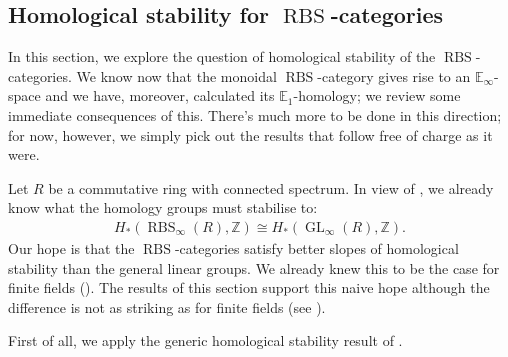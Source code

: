 \documentclass[12pt, reqno]{amsart}
\theoremstyle{plain}
\theoremstyle{definition}
\newcommand{\Z}{\mathbb Z}
\begin{document}
\subsection{Homological stability for \texorpdfstring{$\operatorname{RBS}$}{RBS}-categories}


In this section, we explore the question of homological stability of the $\operatorname{RBS}$-categories. We know now that the monoidal $\operatorname{RBS}$-category gives rise to an $\mathbb{E}_\infty$-space and we have, moreover, calculated its $\mathbb{E}_1$-homology; we review some immediate consequences of this. There's much more to be done in this direction; for now, however, we simply pick out the results that follow free of charge as it were.

Let $R$ be a commutative ring with connected spectrum. In view of , we already know what the homology groups must stabilise to:
\begin{align*}
H_*(\operatorname{RBS}_\infty(R),\Z)\cong H_*(\operatorname{GL}_\infty(R),\Z).
\end{align*}
Our hope is that the $\operatorname{RBS}$-categories satisfy better slopes of homological stability than the general linear groups. We already knew this to be the case for finite fields (\cite[Theorem 1.4]{ClausenOrsnesJansen}). The results of this section support this naive hope although the difference is not as striking as for finite fields (see ).

\medskip

First of all, we apply the generic homological stability result of \cite{GalatiusKupersRandalWilliams}.
\end{document}
